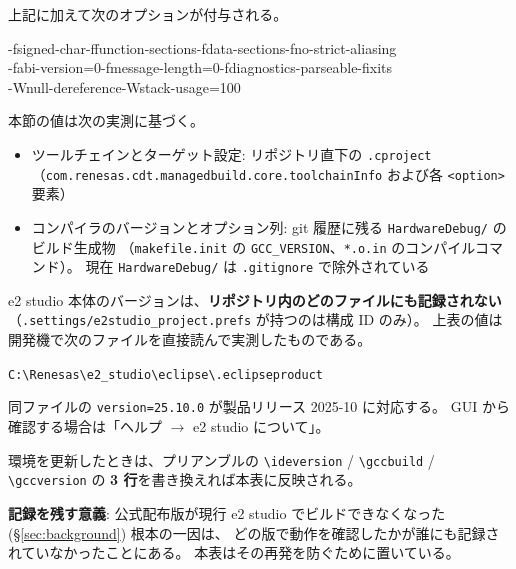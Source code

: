 \documentclass[a4paper,11pt,dvipdfmx]{jsarticle}
\begin{document}
\vspace{2mm}
上記に加えて次のオプションが付与される。

\begin{center}
\ttfamily\small
-fsigned-char\quad -ffunction-sections\quad -fdata-sections\quad -fno-strict-aliasing \\
-fabi-version=0\quad -fmessage-length=0\quad -fdiagnostics-parseable-fixits \\
-Wnull-dereference\quad -Wstack-usage=100
\end{center}

\begin{notebox}[値の出典]
本節の値は次の実測に基づく。

\begin{itemize}[nosep, leftmargin=*]
  \item ツールチェインとターゲット設定: リポジトリ直下の \texttt{.cproject}
        （\texttt{com.renesas.cdt.managedbuild.core.toolchainInfo} および各 \texttt{<option>} 要素）
  \item コンパイラのバージョンとオプション列: git 履歴に残る
        \texttt{HardwareDebug/} のビルド生成物
        （\texttt{makefile.init} の \texttt{GCC\_VERSION}、\texttt{*.o.in} のコンパイルコマンド）。
        現在 \texttt{HardwareDebug/} は \texttt{.gitignore} で除外されている
\end{itemize}
\end{notebox}

\begin{notebox}[製品バージョンはプロジェクトファイルに残らない]
e2 studio 本体のバージョンは、\textbf{リポジトリ内のどのファイルにも記録されない}
（\texttt{.settings/e2studio\_project.prefs} が持つのは構成 ID のみ）。
上表の値は開発機で次のファイルを直接読んで実測したものである。

\begin{center}
\texttt{C:\textbackslash Renesas\textbackslash e2\_studio\textbackslash eclipse\textbackslash .eclipseproduct}
\end{center}

同ファイルの \texttt{version=25.10.0} が製品リリース 2025-10 に対応する。
GUI から確認する場合は「ヘルプ $\rightarrow$ e2 studio について」。

環境を更新したときは、プリアンブルの \texttt{\textbackslash ideversion} /
\texttt{\textbackslash gccbuild} / \texttt{\textbackslash gccversion} の
\textbf{3 行}を書き換えれば本表に反映される。

\medskip
\textbf{記録を残す意義}: 公式配布版が現行 e2 studio でビルドできなくなった
(\hyperref[sec:background]{§\ref*{sec:background}}) 根本の一因は、
どの版で動作を確認したかが誰にも記録されていなかったことにある。
本表はその再発を防ぐために置いている。
\end{notebox}
\end{document}

